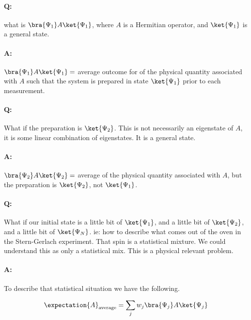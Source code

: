 \paragraph{Q:} what is \(\bra{\Psi_1} A \ket{\Psi_1}\), where \(A\) is a Hermitian operator, and \(\ket{\Psi_1}\) is a general state.

\paragraph{A:} \(\bra{\Psi_1} A \ket{\Psi_1} =\) average outcome for  of the physical quantity associated with \(A\) such that the system is prepared in state \(\ket{\Psi_1}\) prior to each measurement.

\paragraph{Q:}  What if the preparation is \(\ket{\Psi_2}\).  This is not necessarily an eigenstate of \(A\), it is some linear combination of eigenstates.  It is a general state.
\paragraph{A:}  \(\bra{\Psi_2} A \ket{\Psi_2} = \) average of the physical quantity associated with \(A\), but the preparation is \(\ket{\Psi_2}\), not \(\ket{\Psi_1}\).

\paragraph{Q:}  What if our initial state is a little bit of \(\ket{\Psi_1}\), and a little bit of \(\ket{\Psi_2}\), and a little bit of \(\ket{\Psi_N}\).  ie: how to describe what comes out of the oven in the Stern-Gerlach experiment.  That spin is a statistical mixture.  We could understand this as only a statistical mix.  This is a physical relevant problem.
\paragraph{A:}  To describe that statistical situation we have the following.

\begin{equation}\label{eqn:PHY356HNov2:30}
\begin{aligned}
\expectation{A}_{\text{average}} = \sum_j w_j \bra{\Psi_j} A \ket{\Psi_j}
\end{aligned}
\end{equation}

